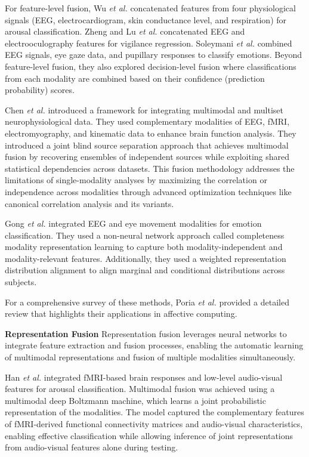 \documentclass[journal]{IEEEtran}
\begin{document}
For feature-level fusion, Wu \emph{et al.} \cite{Wu2010} concatenated features from four physiological signals (EEG, electrocardiogram, skin conductance level, and respiration) for arousal classification. Zheng and Lu \emph{et al.} \cite{Zheng2017} concatenated EEG and electrooculography features for vigilance regression. Soleymani \emph{et al.} \cite{Soleymani2012} combined EEG signals, eye gaze data, and pupillary responses to classify emotions. Beyond feature-level fusion, they also explored decision-level fusion where classifications from each modality are combined based on their confidence (prediction probability) scores.

Chen \emph{et al.} \cite{Chen2016} introduced a framework for integrating multimodal and multiset neurophysiological data. They used complementary modalities of EEG, fMRI, electromyography, and kinematic data to enhance brain function analysis. They introduced a joint blind source separation approach that achieves multimodal fusion by recovering ensembles of independent sources while exploiting shared statistical dependencies across datasets. This fusion methodology addresses the limitations of single-modality analyses by maximizing the correlation or independence across modalities through advanced optimization techniques like canonical correlation analysis and its variants.

Gong \emph{et al.} \cite{Gong2024a} integrated EEG and eye movement modalities for emotion classification. They used a non-neural network approach called completeness modality representation learning to capture both modality-independent and modality-relevant features. Additionally, they used a weighted representation distribution alignment to align marginal and conditional distributions across subjects.

For a comprehensive survey of these methods, Poria \emph{et al.} provided a detailed review that highlights their applications in affective computing.

\textbf{Representation Fusion} Representation fusion leverages neural networks to integrate feature extraction and fusion processes, enabling the automatic learning of multimodal representations and fusion of multiple modalities simultaneously.

Han \emph{et al.} \cite{Han2015} integrated fMRI-based brain responses and low-level audio-visual features for arousal classification. Multimodal fusion was achieved using a multimodal deep Boltzmann machine, which learns a joint probabilistic representation of the modalities. The model captured the complementary features of fMRI-derived functional connectivity matrices and audio-visual characteristics, enabling effective classification while allowing inference of joint representations from audio-visual features alone during testing.
\end{document}
